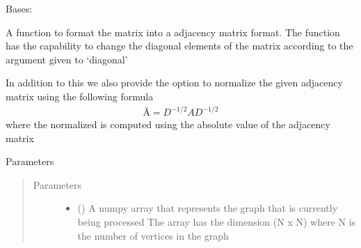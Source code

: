 \documentclass[letterpaper,10pt,english]{sphinxmanual}
\begin{document}
\begin{fulllineitems}
\label{\detokenize{modules/gqcml.data:gqcml.data.Data.Preprocessor}}
Bases: 

\begin{fulllineitems}
\label{\detokenize{modules/gqcml.data:gqcml.data.Data.Preprocessor.adjacency_matrix}}
A function to format the matrix into a adjacency matrix format.
The function has the capability to change the diagonal elements of the matrix
according to the argument given to ‘diagonal’

In addition to this we also provide the option to normalize the given adjacency matrix
using the following formula
\begin{equation*}
\begin{split}Ã=D^{-1/2}AD^{-1/2}\end{split}
\end{equation*}
where the normalized is computed using the absolute value of the adjacency matrix

Parameters
\begin{quote}\begin{description}
\item[{Parameters}] \leavevmode\begin{itemize}
\item {} 
\sphinxstyleliteralstrong{\sphinxupquote{(}}\sphinxstyleliteralstrong{\sphinxupquote{)}} () \textendash{} A numpy array that represents the graph that is currently being processed
The array has the dimension (N x N) where N is the number of vertices in the graph


\end{itemize}
\end{description}
\end{quote}
\end{fulllineitems}
\end{fulllineitems}
\end{document}
